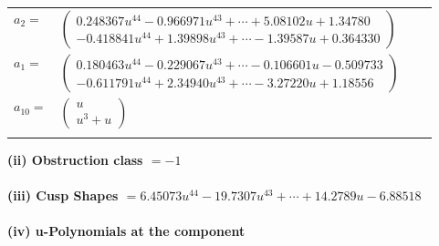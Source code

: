 \documentclass[1p]{elsarticle_modified}
\theoremstyle{definition}
\begin{document}
\begin{tabular}{m{7pt} m{180pt} m{7pt} m{180pt} }
\flushright $a_{2}=$&$\begin{pmatrix}0.248367 u^{44}-0.966971 u^{43}+\cdots+5.08102 u+1.34780\\-0.418841 u^{44}+1.39898 u^{43}+\cdots-1.39587 u+0.364330\end{pmatrix}$ \\
\flushright $a_{1}=$&$\begin{pmatrix}0.180463 u^{44}-0.229067 u^{43}+\cdots-0.106601 u-0.509733\\-0.611791 u^{44}+2.34940 u^{43}+\cdots-3.27220 u+1.18556\end{pmatrix}$ \\
\flushright $a_{10}=$&$\begin{pmatrix}u\\u^3+u\end{pmatrix}$\\&\end{tabular}
\flushleft \textbf{(ii) Obstruction class $= -1$}\\~\\
\flushleft \textbf{(iii) Cusp Shapes $= 6.45073 u^{44}-19.7307 u^{43}+\cdots+14.2789 u-6.88518$}\\~\\
\newpage\renewcommand{\arraystretch}{1}
\flushleft \textbf{(iv) u-Polynomials at the component}\newline \\
\end{document}
